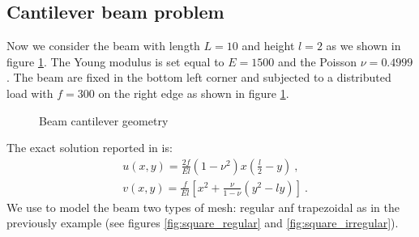 \documentclass[preprint,12pt,authoryear]{elsarticle}
\begin{document}
\subsection{Cantilever beam problem}
Now we consider the beam with length $L=10$ and height $l=2$ as we shown in figure \ref{fig:beam_geometry}. The Young modulus is set equal to $E=1500$ and the Poisson $\nu=0.4999$.
The beam are fixed in the bottom left corner and subjected to a distributed load with $f=300$ on the right edge as shown in figure \ref{fig:beam_geometry}.
%
\begin{figure}[h!]
\begin{center}

\caption{Beam cantilever geometry \label{fig:beam_geometry}}
\end{center}
\end{figure}
%
The exact solution reported in \cite{djoko} is:
\begin{equation}
\begin{split}
&u(x,y) = \frac{2 f}{E l} (1-\nu^{2}) x \left( \frac{l}{2} - y \right)\: , \\
&v(x,y) = \frac{f}{E l} \left[ x^{2} + \frac{\nu}{1-\nu}\left(y^{2}-l y 
\right) \right] \: .
\end{split}
\end{equation}
We use to model the beam two types of mesh: regular anf trapezoidal as in the previously example (see figures \ref{fig:square_regular} and \ref{fig:square_irregular}).
\end{document}
